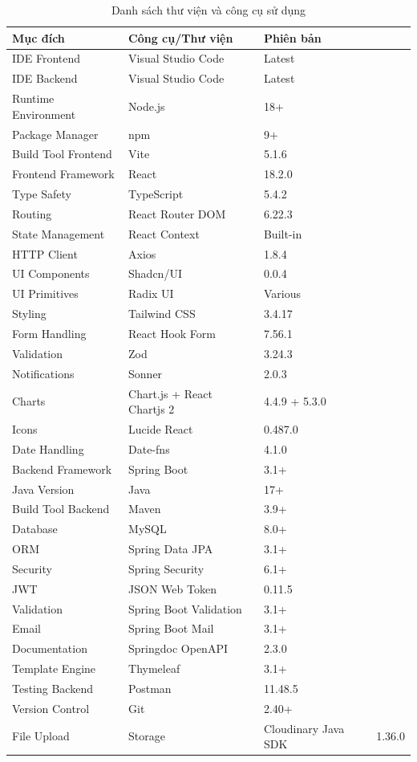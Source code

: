 \documentclass[../DoAn.tex]{subfiles}
\begin{document}
\begin{table}[H]
\centering{}
\begin{tabular}{|l|l|l|}
\hline
\textbf{Mục đích} & \textbf{Công cụ/Thư viện} & \textbf{Phiên bản} \\ \hline
IDE Frontend & Visual Studio Code & Latest \\ \hline
IDE Backend & Visual Studio Code & Latest \\ \hline
Runtime Environment & Node.js & 18+ \\ \hline
Package Manager & npm & 9+ \\ \hline
Build Tool Frontend & Vite & 5.1.6 \\ \hline
Frontend Framework & React & 18.2.0 \\ \hline
Type Safety & TypeScript & 5.4.2 \\ \hline
Routing & React Router DOM & 6.22.3 \\ \hline
State Management & React Context & Built-in \\ \hline
HTTP Client & Axios & 1.8.4 \\ \hline
UI Components & Shadcn/UI & 0.0.4 \\ \hline
UI Primitives & Radix UI & Various \\ \hline
Styling & Tailwind CSS & 3.4.17 \\ \hline
Form Handling & React Hook Form & 7.56.1 \\ \hline
Validation & Zod & 3.24.3 \\ \hline
Notifications & Sonner & 2.0.3 \\ \hline
Charts & Chart.js + React Chartjs 2 & 4.4.9 + 5.3.0 \\ \hline
Icons & Lucide React & 0.487.0 \\ \hline
Date Handling & Date-fns & 4.1.0 \\ \hline
Backend Framework & Spring Boot & 3.1+ \\ \hline
Java Version & Java & 17+ \\ \hline
Build Tool Backend & Maven & 3.9+ \\ \hline
Database & MySQL & 8.0+ \\ \hline
ORM & Spring Data JPA & 3.1+ \\ \hline
Security & Spring Security & 6.1+ \\ \hline
JWT & JSON Web Token & 0.11.5 \\ \hline
Validation & Spring Boot Validation & 3.1+ \\ \hline
Email & Spring Boot Mail & 3.1+ \\ \hline
Documentation & Springdoc OpenAPI & 2.3.0 \\ \hline
Template Engine & Thymeleaf & 3.1+ \\ \hline
Testing Backend & Postman & 11.48.5 \\ \hline
Version Control & Git & 2.40+ \\ \hline
File Upload & Storage & Cloudinary Java SDK & 1.36.0 \\ \hline
\end{tabular}
\caption{Danh sách thư viện và công cụ sử dụng}
\label{table:tools_libraries}
\end{table}
\end{document}
